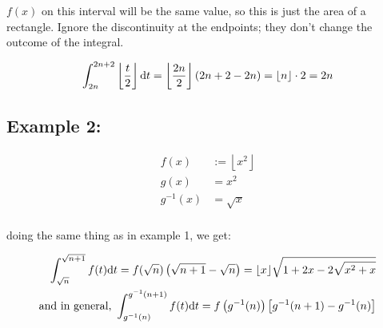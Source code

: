 \documentclass[12pt]{article}
\begin{document}
		$f(x)$ on this interval will be the same value, so this is just the area of a rectangle.
		Ignore the discontinuity at the endpoints; they don't change the outcome of the integral.

		\begin{align*}
			\int_{2n}^{2n+2}\left\lfloor\frac t2\right\rfloor\text dt
			= \left\lfloor\frac{2n}2\right\rfloor(2n+2-2n)
			= \lfloor n\rfloor\cdot2 = 2n
		\end{align*}

	\subsection*{Example 2:}

		\begin{minipage}{0.5\textwidth}
			\begin{align*}
				f(x) & := \left\lfloor x^2\right\rfloor\\
				g(x) & = x^2\\
				g^{-1}(x) & = \sqrt x\\
			\end{align*}
		\end{minipage}
		\hfill
		\begin{minipage}{0.5\textwidth}
		\end{minipage}

		doing the same thing as in example 1, we get:

		\begin{align*}
			\int_{\sqrt n}^{\sqrt{n+1}}f(t)\text dt = f(\sqrt n)\left(\sqrt{n+1}-\sqrt n\right)
			= \lfloor x\rfloor\sqrt{1+2x-2\sqrt{x^2+x}}\\
			\text{and in general, }\int_{g^{-1}(n)}^{g^{-1}(n+1)}f(t)\text dt
			=f\left(g^{-1}(n)\right)\left[g^{-1}(n+1)-g^{-1}(n)\right]
		\end{align*}
\end{document}
